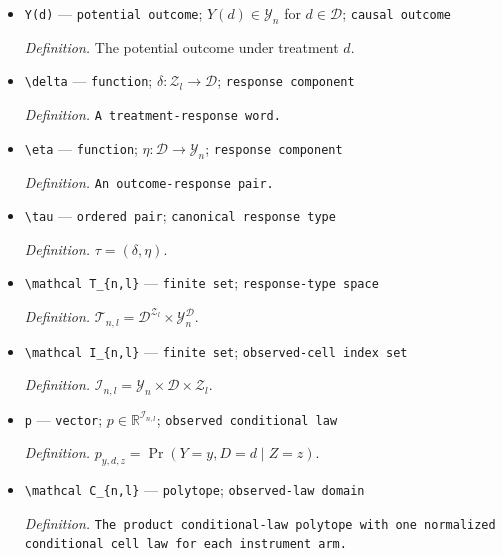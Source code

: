 \documentclass{article}
\begin{document}
\begin{itemize}
  \item \texttt{Y(d)} --- \texttt{potential outcome}; \(Y(d)\in\mathcal Y_n\) for \(d\in\mathcal D\); \texttt{causal outcome}
  \par\smallskip\noindent\emph{Definition.} The potential outcome under treatment \(d\).
  \item \texttt{\textbackslash{}\allowbreak{}delta} --- \texttt{function}; \(\delta:\mathcal Z_l\to\mathcal D\); \texttt{response component}
  \par\smallskip\noindent\emph{Definition.} \texttt{A treatment-\allowbreak{}response word.}
  \item \texttt{\textbackslash{}\allowbreak{}eta} --- \texttt{function}; \(\eta:\mathcal D\to\mathcal Y_n\); \texttt{response component}
  \par\smallskip\noindent\emph{Definition.} \texttt{An outcome-\allowbreak{}response pair.}
  \item \texttt{\textbackslash{}\allowbreak{}tau} --- \texttt{ordered pair}; \texttt{canonical response type}
  \par\smallskip\noindent\emph{Definition.} \(\tau=(\delta,\eta)\).
  \item \texttt{\textbackslash{}\allowbreak{}mathcal T\_\allowbreak{}\{n,\allowbreak{}l\}\allowbreak{}} --- \texttt{finite set}; \texttt{response-\allowbreak{}type space}
  \par\smallskip\noindent\emph{Definition.} \(\mathcal T_{n,l}=\mathcal D^{\mathcal Z_l}\times\mathcal Y_n^{\mathcal D}\).
  \item \texttt{\textbackslash{}\allowbreak{}mathcal I\_\allowbreak{}\{n,\allowbreak{}l\}\allowbreak{}} --- \texttt{finite set}; \texttt{observed-\allowbreak{}cell index set}
  \par\smallskip\noindent\emph{Definition.} \(\mathcal I_{n,l}=\mathcal Y_n\times\mathcal D\times\mathcal Z_l\).
  \item \texttt{p} --- \texttt{vector}; \(p\in\mathbb R^{\mathcal I_{n,l}}\); \texttt{observed conditional law}
  \par\smallskip\noindent\emph{Definition.} \(p_{y,d,z}=\Pr(Y=y,D=d\mid Z=z)\).
  \item \texttt{\textbackslash{}\allowbreak{}mathcal C\_\allowbreak{}\{n,\allowbreak{}l\}\allowbreak{}} --- \texttt{polytope}; \texttt{observed-\allowbreak{}law domain}
  \par\smallskip\noindent\emph{Definition.} \texttt{The product conditional-\allowbreak{}law polytope with one normalized conditional cell law for each instrument arm.}

\end{itemize}
\end{document}
